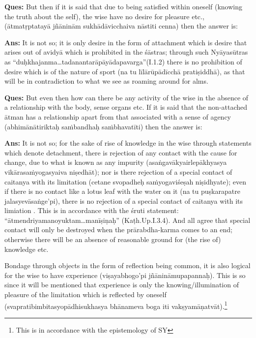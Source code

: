 
\eject


\textbf{Ques:} But then if it is said that due to being satisfied within oneself (knowing the truth about the self), the wise have no desire for pleasure etc., (ātmatṛptatayā jñāninām sukhādāvicchaiva nāstiti cenna) then the answer is:

\textbf{Ans:} It is not so; it is only desire in the form of attachment which is desire that arises out of avidyā which is prohibited in the śāstras; through such Nyāyasūtras as “duḥkhajanma…tadanantarāpāyādapavarga”\break (I.1.2) there is no prohibition of desire which is of the nature of sport (na tu līlārūpādīcchā pratiṣiddhā), as that will be in contradiction to what we see as roaming around for alms.

\textbf{Ques:} But even then how can there be any activity of the wise in the absence of a relationship with the body, sense organs etc. If it is said that the non-attached ātman has a relationship apart from that associated with a sense of agency (abhimānātiriktaḥ saṁbandhaḥ saṁbhavatīti) then the answer is:

\textbf{Ans:} It is not so; for the sake of rise of knowledge in the wise through statements which denote detachment, there is rejection of any contact with the cause for change, due to what is known as any impurity (asaṅgavākyairlepākhyasya vikārasaṁyogasyaiva niṣedhāt); nor is there rejection of a special contact of caitanya with its limitation (cetane svopadheḥ saṁyogaviśeṣah niṣidhyate); even if there is no contact like a lotus leaf with the water on it (na tu puṣkarapatre jalasyevāsaṅge’pi), there is no rejection of a special contact of caitanya with its limiation . This is in accordance with the śruti statement: “ātmendriyamanoyuktam…manīṣiṇaḥ” (Kaṭh.Up.I.3.4). And all agree that special contact will only be destroyed when the prārabdha-karma comes to an end; otherwise there will be an absence of reasonable ground for (the rise of) knowledge etc.

Bondage through objects in the form of reflection being common, it is also logical for the wise to have experience (viṣayabhogo’pi jñānināmupapannaḥ). This is so since it will be mentioned that experience is only the knowing/illumination of pleasure of the limitation which is reflected by oneself (svapratibimbitasyopādhisukhasya bhānameva boga iti vakṣyamāṇatvāt).\footnote{This is in accordance with the epistemology of SY} 

